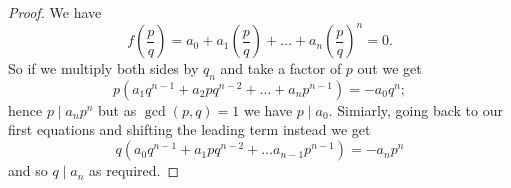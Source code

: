 \begin{proof}
    We have
    \[ f\left(\frac pq\right) = a_0 + a_1 \left(\frac pq\right) + \ldots + a_n \left(\frac pq\right)^n = 0. \]
    So if we multiply both sides by $q_n$ and take a factor of $p$ out we get
    \[ p(a_1 q^{n - 1} + a_2 pq^{n - 2} + \ldots + a_n p^{n - 1}) = -a_0q^n; \]
    hence $p \mid a_n p^n$ but as $\gcd{(p, q)} = 1$ we have $p \mid a_0$. Simiarly, going back to our first equations and shifting the leading term instead we get
    \[ q(a_0q^{n - 1} + a_1 p q^{n - 2} + \ldots a_{n - 1} p^{n - 1}) = -a_np^n \]
    and so $q \mid a_n$ as required.
\end{proof}
